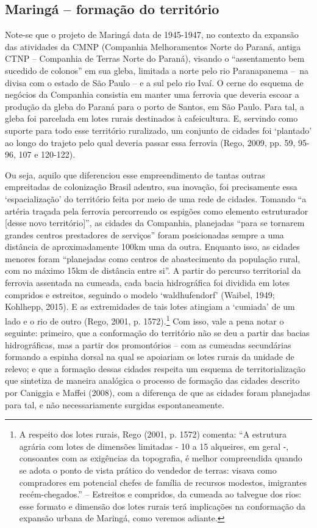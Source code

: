 \documentclass[12pt, a4paper]{book} %
\begin{document}
                \subsection*{Maringá – formação do território}

        Note-se que o projeto de Maringá data de 1945-1947, no contexto da expansão das atividades da CMNP (Companhia Melhoramentos Norte do Paraná, antiga CTNP – Companhia de Terras Norte do Paraná), visando o ``assentamento bem sucedido de colonos'' em sua gleba, limitada a norte pelo rio Paranapanema – na divisa com o estado de São Paulo – e a sul pelo rio Ivaí. O cerne do esquema de negócios da Companhia consistia em manter uma ferrovia que deveria escoar a produção da gleba do Paraná para o porto de Santos, em São Paulo. Para tal, a gleba foi parcelada em lotes rurais destinados à cafeicultura. E, servindo como suporte para todo esse território ruralizado, um conjunto de cidades foi `plantado' ao longo do trajeto pelo qual deveria passar essa ferrovia (Rego, 2009, pp. 59, 95-96, 107 e 120-122). 

        Ou seja, aquilo que diferenciou esse empreendimento de tantas outras empreitadas de colonização Brasil adentro, sua inovação, foi precisamente essa `espacialização' do território feita por meio de uma rede de cidades. Tomando ``a artéria traçada pela ferrovia percorrendo os espigões como elemento estruturador [desse novo território]'', as cidades da Companhia, planejadas ``para se tornarem grandes centros prestadores de serviços'' foram posicionadas sempre a uma distância de aproximadamente 100km uma da outra. Enquanto isso, as cidades menores foram ``planejadas como centros de abastecimento da população rural, com no máximo 15km de distância entre si''. A partir do percurso territorial da ferrovia assentada na cumeada, cada bacia hidrográfica foi dividida em lotes compridos e estreitos, seguindo o modelo `waldhufendorf' (Waibel, 1949; Kohlhepp, 2015). E as extremidades de tais lotes atingiam a `cumiada' de um lado e o rio de outro (Rego, 2001, p. 1572).\footnote[0]{ A respeito dos lotes rurais, Rego (2001, p. 1572) comenta: ``A estrutura agrária com lotes de dimensões limitadas - 10 a 15 alqueires, em geral -, consoantes com as exigências da topografia, é melhor compreendida quando se adota o ponto de vista prático do vendedor de terras: visava como compradores em potencial chefes de família de recursos modestos, imigrantes recém-chegados.'' – Estreitos e compridos, da cumeada ao talvegue dos rios: esse formato e dimensão dos lotes rurais terá implicações na conformação da expansão urbana de Maringá, como veremos adiante.} Com isso, vale a pena notar o seguinte: primeiro, que a conformação do território não se deu a partir das bacias hidrográficas, mas a partir dos promontórios – com as cumeadas secundárias formando a espinha dorsal na qual se apoiariam os lotes rurais da unidade de relevo; e que a formação dessas cidades respeita um esquema de territorialização que sintetiza de maneira analógica o processo de formação das cidades descrito por Caniggia e Maffei (2008), com a diferença de que as cidades foram planejadas para tal, e não necessariamente surgidas espontaneamente.
\end{document}
